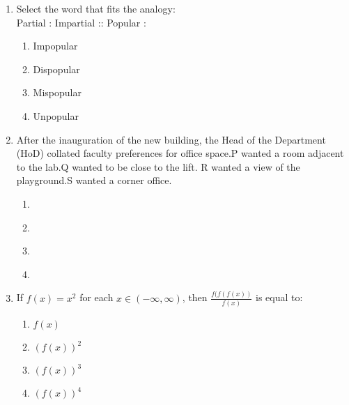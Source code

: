 \documentclass[journal,12pt,onecolumn]{IEEEtran}
\theoremstyle{remark}
\begin{document}
\begin{enumerate}
    \item Select the word that fits the analogy:\\
    Partial : Impartial :: Popular :
    \begin{enumerate}
        \item Impopular
        \item Dispopular
        \item Mispopular
        \item Unpopular
    \end{enumerate}

    \item After the inauguration of the new building, the Head of the Department (HoD) collated faculty preferences for office space.P wanted a room adjacent to the lab.Q wanted to be close to the lift. R wanted a view of the playground.S wanted a corner office.
    \begin{enumerate}
        \item \begin{figure}[H]
        \centering
    \end{figure}
        \item \begin{figure}[H]
        \centering
    \end{figure}
    \item \begin{figure}[H]
        \centering
    \end{figure}
    \item \begin{figure}[H]
        \centering
    \end{figure}
    \end{enumerate}
    

    \item If $f(x) = x^2$ for each $x \in (-\infty, \infty)$, then $\frac{f(f(f(x))}{f(x)}$ is equal to:
    \begin{enumerate}
        \item $f(x)$
        \item $(f(x))^2$
        \item $(f(x))^3$
        \item $(f(x))^4$
    \end{enumerate}

\end{enumerate}
\end{document}
